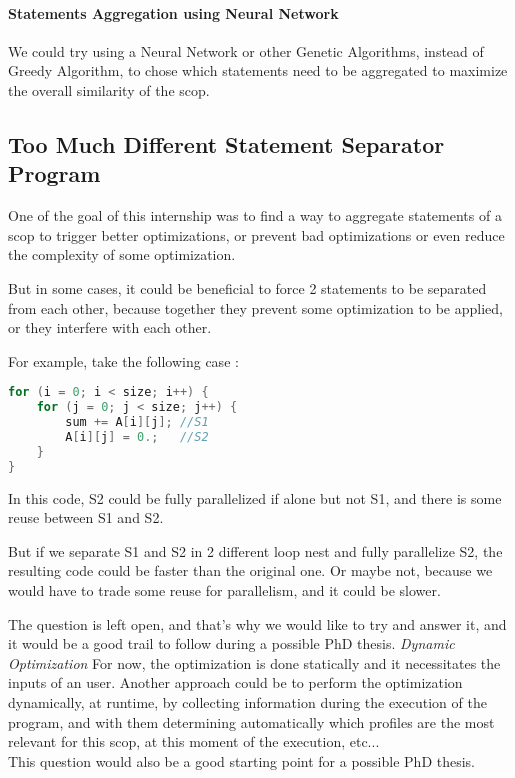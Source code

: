 \documentclass[paper=a4, fontsize=11.5pt]{scrartcl}
\numberwithin{equation}{section}        %
\numberwithin{figure}{section}          %
\numberwithin{table}{section}               %
\begin{document}
        \paragraph*{Statements Aggregation using Neural Network}
            We could try using a Neural Network or other Genetic Algorithms, instead
            of Greedy Algorithm, to chose which statements need to be aggregated to
            maximize the overall similarity of the scop.
    \subsection{Too Much Different Statement Separator Program}
        One of the goal of this internship was to find a way to aggregate statements
        of a scop to trigger better optimizations, or prevent bad optimizations or even
        reduce the complexity of some optimization.

        But in some cases, it could be beneficial to force 2 statements to be separated
        from each other, because together they prevent some optimization to be applied,
        or they interfere with each other.

        For example, take the following case :
\begin{lstlisting}[frame=single, language=C, caption={Statements Separation Example}, label={lst:stmt_sep_example}]
for (i = 0; i < size; i++) {
    for (j = 0; j < size; j++) {
        sum += A[i][j]; //S1
        A[i][j] = 0.;   //S2
    }
}
\end{lstlisting}
        In this code, S2 could be fully parallelized if alone but not S1, and there is
        some reuse between S1 and S2.

        But if we separate S1 and S2 in 2 different loop nest and fully parallelize S2,
        the resulting code could be faster than the original one. Or maybe not, because
        we would have to trade some reuse for parallelism, and it could be slower.
        
        The question is left open, and that's why we would like to try and answer it, and it
        would be a good trail to follow during a possible PhD thesis.
    \textit{Dynamic Optimization}
        For now, the optimization is done statically and it necessitates the inputs of an
        user. Another approach could be to perform the optimization dynamically, at runtime,
        by collecting information during the execution of the program, and with them
        determining automatically which profiles are the most relevant for this scop, at
        this moment of the execution, etc...\\
        This question would also be a good starting point for a possible PhD thesis.

            



\end{document}
